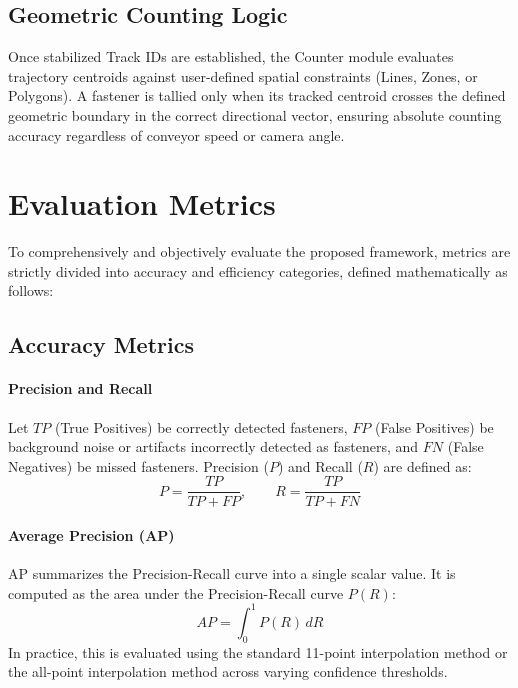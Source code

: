 \subsection{Geometric Counting Logic}

Once stabilized Track IDs are established, the Counter module evaluates trajectory centroids against user-defined spatial constraints (Lines, Zones, or Polygons). A fastener is tallied only when its tracked centroid crosses the defined geometric boundary in the correct directional vector, ensuring absolute counting accuracy regardless of conveyor speed or camera angle.

\section{Evaluation Metrics}
\label{sec:metrics}

To comprehensively and objectively evaluate the proposed framework, metrics are strictly divided into accuracy and efficiency categories, defined mathematically as follows:

\subsection{Accuracy Metrics}
\paragraph{Precision and Recall}
Let $TP$ (True Positives) be correctly detected fasteners, $FP$ (False Positives) be background noise or artifacts incorrectly detected as fasteners, and $FN$ (False Negatives) be missed fasteners. Precision ($P$) and Recall ($R$) are defined as:
\begin{equation}
    P = \frac{TP}{TP + FP}, \quad \quad R = \frac{TP}{TP + FN}
\end{equation}

\paragraph{Average Precision (AP)}
AP summarizes the Precision-Recall curve into a single scalar value. It is computed as the area under the Precision-Recall curve $P(R)$:
\begin{equation}
    AP = \int_{0}^{1} P(R) \, dR
\end{equation}
In practice, this is evaluated using the standard 11-point interpolation method or the all-point interpolation method across varying confidence thresholds.

